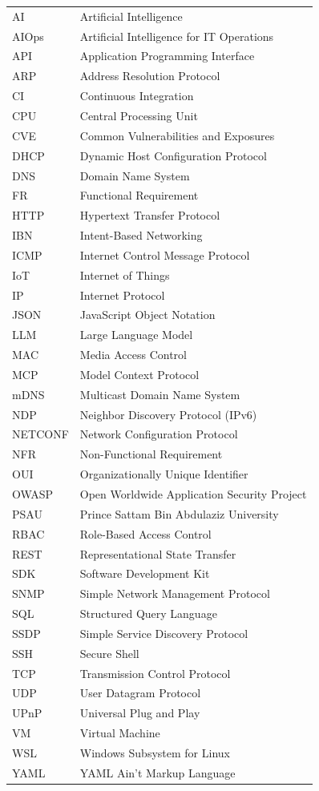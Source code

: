 \setlength{\LTleft}{0pt}
\begin{longtable}{@{}p{3.2cm}l@{}}
AI      & Artificial Intelligence \\
AIOps   & Artificial Intelligence for IT Operations \\
API     & Application Programming Interface \\
ARP     & Address Resolution Protocol \\
CI      & Continuous Integration \\
CPU     & Central Processing Unit \\
CVE     & Common Vulnerabilities and Exposures \\
DHCP    & Dynamic Host Configuration Protocol \\
DNS     & Domain Name System \\
FR      & Functional Requirement \\
HTTP    & Hypertext Transfer Protocol \\
IBN     & Intent-Based Networking \\
ICMP    & Internet Control Message Protocol \\
IoT     & Internet of Things \\
IP      & Internet Protocol \\
JSON    & JavaScript Object Notation \\
LLM     & Large Language Model \\
MAC     & Media Access Control \\
MCP     & Model Context Protocol \\
mDNS    & Multicast Domain Name System \\
NDP     & Neighbor Discovery Protocol (IPv6) \\
NETCONF & Network Configuration Protocol \\
NFR     & Non-Functional Requirement \\
OUI     & Organizationally Unique Identifier \\
OWASP   & Open Worldwide Application Security Project \\
PSAU    & Prince Sattam Bin Abdulaziz University \\
RBAC    & Role-Based Access Control \\
REST    & Representational State Transfer \\
SDK     & Software Development Kit \\
SNMP    & Simple Network Management Protocol \\
SQL     & Structured Query Language \\
SSDP    & Simple Service Discovery Protocol \\
SSH     & Secure Shell \\
TCP     & Transmission Control Protocol \\
UDP     & User Datagram Protocol \\
UPnP    & Universal Plug and Play \\
VM      & Virtual Machine \\
WSL     & Windows Subsystem for Linux \\
YAML    & YAML Ain't Markup Language \\
\end{longtable}

